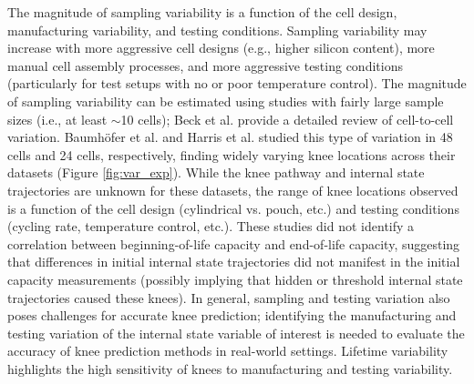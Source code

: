 \documentclass[journal=jpclcd,manuscript=article]{achemso}
\begin{document}
The magnitude of sampling variability is a function of the cell design, manufacturing variability, and testing conditions. Sampling variability may increase with more aggressive cell designs (e.g., higher silicon content), more manual cell assembly processes, and more aggressive testing conditions (particularly for test setups with no or poor temperature control). The magnitude of sampling variability can be estimated using studies with fairly large sample sizes (i.e., at least $\sim$10 cells)\cite{dechent_estimation_2021}; Beck et al.\cite{beck_inhomogeneities_2021} provide a detailed review of cell-to-cell variation. Baumhöfer et al.\cite{baumhofer_production_2014} and Harris et al.\cite{harris_failure_2017} studied this type of variation in 48 cells and 24 cells, respectively, finding widely varying knee locations across their datasets (Figure \ref{fig:var_exp}).
While the knee pathway and internal state trajectories are unknown for these datasets, the range of knee locations observed is a function of the cell design (cylindrical vs. pouch, etc.) and testing conditions (cycling rate, temperature control, etc.).
These studies did not identify a correlation between beginning-of-life capacity and end-of-life capacity, suggesting that differences in initial internal state trajectories did not manifest in the initial capacity measurements (possibly implying that hidden or threshold internal state trajectories caused these knees). In general, sampling and testing variation also poses challenges for accurate knee prediction; identifying the manufacturing and testing variation of the internal state variable of interest is needed to evaluate the accuracy of knee prediction methods in real-world settings.
Lifetime variability highlights the high sensitivity of knees to manufacturing and testing variability.
\end{document}
